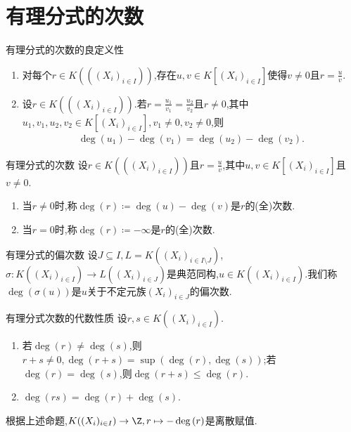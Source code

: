 \section{有理分式的次数}

\begin{lemma}{有理分式的次数的良定义性}{}
	\begin{enumerate}
		\item 对每个$r\in K(((X_{i})_{i\in I}))$,存在$u,v\in K[\left(X_{i}\right)_{i\in I}]$使得$v\neq 0$且$r=\frac{u}{v}$.
		\item 设$r\in K(((X_{i})_{i\in I}))$.若$r=\frac{u_{1}}{v_{1}}=\frac{u_{2}}{v_{2}}$且$r\neq 0$,其中$u_{1},v_{1},u_{2},v_{2}\in K[\left(X_{i}\right)_{i\in I}],v_{1}\neq 0,v_{2}\neq 0$,则
		\begin{align*}
			\deg\left(u_{1}\right)-\deg\left(v_{1}\right)=\deg\left(u_{2}\right)-\deg\left(v_{2}\right).
		\end{align*}
	\end{enumerate}
\end{lemma}

\begin{definition}{有理分式的次数}{}
	设$r\in K(((X_{i})_{i\in I}))$且$r=\frac{u}{v}$,其中$u,v\in K[\left(X_{i}\right)_{i\in I}]$且$v\neq 0$.
	\begin{enumerate}
		\item 当$r\neq 0$时,称$\deg\left(r\right)\coloneq\deg\left(u\right)-\deg\left(v\right)$是$r$的(全)次数.
		\item 当$r=0$时,称$\deg\left(r\right)\coloneq-\infty$是$r$的(全)次数.
	\end{enumerate}
\end{definition}

\begin{definition}{有理分式的偏次数}{}
	设$J\subseteq I,L=K((X_{i})_{i\in I\setminus J})$,$\sigma:K((X_{i})_{i\in I})\to L((X_{i})_{i\in J})$是典范同构,$u\in K((X_{i})_{i\in I})$.我们称$\deg\left(\sigma\left(u\right)\right)$是$u$关于不定元族$\left(X_{i}\right)_{i\in J}$的偏次数.
\end{definition}

\begin{proposition}{有理分式次数的代数性质}{}
	设$r,s\in K((X_{i})_{i\in I})$.
	\begin{enumerate}
		\item 若$\deg\left(r\right)\neq\deg\left(s\right)$,则$r+s\neq 0,\deg\left(r+s\right)=\sup\left(\deg\left(r\right),\deg\left(s\right)\right)$;若$\deg\left(r\right)=\deg\left(s\right)$,则$\deg\left(r+s\right)\leq\deg\left(r\right)$.
		\item $\deg\left(rs\right)=\deg\left(r\right)+\deg\left(s\right)$.
	\end{enumerate}
\end{proposition}

\begin{remark}{}{}
	根据上述命题,$K((X_{i})_{i\in I})\to\Z,r\mapsto-\deg\left(r\right)$是离散赋值.
\end{remark}























